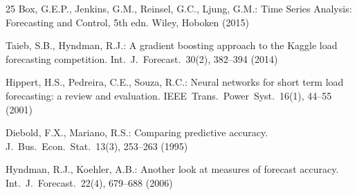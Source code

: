 \documentclass[runningheads]{llncs}
\begin{document}
\begin{thebibliography}{25}
Box, G.E.P., Jenkins, G.M., Reinsel, G.C., Ljung, G.M.: Time Series Analysis: Forecasting and Control, 5th edn. Wiley, Hoboken (2015)

Taieb, S.B., Hyndman, R.J.: A gradient boosting approach to the {K}aggle load forecasting competition. Int.\ J.\ Forecast.\ 30(2), 382--394 (2014)

Hippert, H.S., Pedreira, C.E., Souza, R.C.: Neural networks for short term load forecasting: a review and evaluation. IEEE\ Trans.\ Power\ Syst.\ 16(1), 44--55 (2001)

Diebold, F.X., Mariano, R.S.: Comparing predictive accuracy. J.\ Bus.\ Econ.\ Stat.\ 13(3), 253--263 (1995)

Hyndman, R.J., Koehler, A.B.: Another look at measures of forecast accuracy. Int.\ J.\ Forecast.\ 22(4), 679--688 (2006)

\end{thebibliography}
\end{document}
